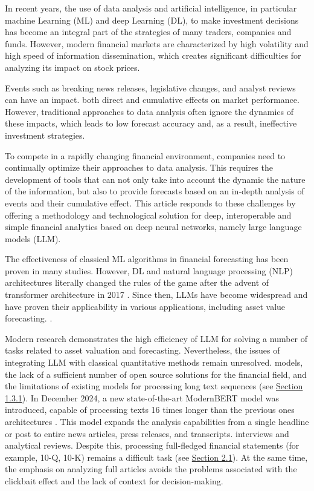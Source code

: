 In recent years, the use of data analysis and artificial intelligence, in particular machine Learning (ML)
and deep Learning (DL), to make investment decisions has become an integral part of the strategies of many
traders, companies and funds. However, modern financial markets are characterized by high volatility
and high speed of information dissemination, which creates significant difficulties for analyzing its impact
on stock prices.

Events such as breaking news releases, legislative changes, and analyst reviews can have an impact.
both direct and cumulative effects on market performance. However, traditional approaches to
data analysis often ignore the dynamics of these impacts, which leads to low forecast accuracy and, as a result,
ineffective investment strategies.

To compete in a rapidly changing financial environment, companies need to continually optimize their
approaches to data analysis. This requires the development of tools that can not only take into account the dynamic
the nature of the information, but also to provide forecasts based on an in-depth analysis of events and their cumulative effect.
This article responds to these challenges by offering a methodology and technological solution for deep, interoperable
and simple financial analytics based on deep neural networks, namely large language models (LLM).

The effectiveness of classical ML algorithms in financial forecasting has been proven in many studies.
However, DL and natural language processing (NLP) architectures literally changed the rules of the game after the advent of
transformer architecture in 2017 \parencite{vaswani2017attention}. Since then, LLMs have become widespread
and have proven their applicability in various applications, including asset value forecasting.
\parencite{Jiang2023, Halder2022, Kim2023}.

Modern research demonstrates the high efficiency of LLM for solving a number of tasks related to asset valuation and
forecasting. Nevertheless, the issues of integrating LLM with classical quantitative methods remain unresolved.
models, the lack of a sufficient number of open source solutions for the financial field, and the limitations
of existing models for processing long text sequences (see \hyperref[sec:models]{Section 1.3.1}).
In December 2024, a new state-of-the-art ModernBERT model was introduced, capable of processing texts
16 times longer than the previous ones architectures \parencite{Warner2024ModernBERT, devlin2019BERT}. This model
expands the analysis capabilities from a single headline or post to entire news articles, press releases, and transcripts.
interviews and analytical reviews. Despite this, processing full-fledged financial statements (for example, 10-Q, 10-K)
remains a difficult task (see \hyperref[sec:limits]{Section 2.1}). At the same time, the emphasis on analyzing full articles
avoids the problems associated with the clickbait effect and the lack of context for decision-making.

